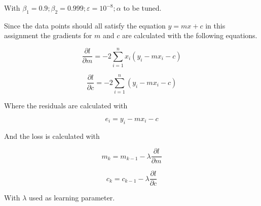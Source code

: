 With $\beta_1 = 0.9; \beta_2 = 0.999; \varepsilon = 10^{-8}; \alpha $ to be tuned.

Since the data points should all satisfy the equation $y = mx + c$ in this assignment the gradients for $m$ and $c$ are calculated with the following equations.

\begin{equation}\label{gradients1}
    \frac{\partial l}{\partial m} = -2 \sum\limits_{i=1}^n x_i (y_i - mx_i - c)
\end{equation}

\begin{equation}\label{gradients2}
    \frac{\partial l}{\partial c} = -2 \sum\limits_{i=1}^n (y_i - mx_i - c)
\end{equation}

Where the residuals are calculated with

\begin{equation}\label{gradients2}
    e_i = y_i - mx_i - c
\end{equation}

And the loss is calculated with

\begin{equation}\label{gradients2}
    m_k = m_{k-1} - \lambda \frac{\partial l}{\partial m}
\end{equation}

\begin{equation}\label{gradients2}
    c_k = c_{k-1} - \lambda \frac{\partial l}{\partial c}
\end{equation}

With $\lambda$ used as learning parameter.



